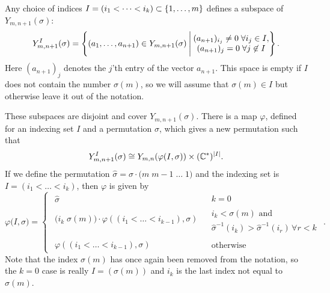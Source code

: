 \begin{lemma}
  \label{lem:permutation}
  Any choice of indices $I= (i_1<\dots<i_k) \subset \left\{ 1,\dots,m \right\}$
  defines a subspace of $Y_{m,n+1}(\sigma)$:
  \[ Y_{m,n+1}^I(\sigma) = \left\{ (a_1,\dots,a_{n+1}) \in
    Y_{m,n+1}(\sigma) \:\Bigg\vert\: 
    \begin{matrix} 
      (a_{n+1})_{i_j} \neq 0\; \forall i_j \in I, \\
      (a_{n+1})_j = 0 \;\forall j \not\in I
    \end{matrix}  \right\}. \]
  Here $(a_{n+1})_j$ denotes the $j$'th entry of the vector $a_{n+1}$.
  This space is empty if $I$ does not contain the number $\sigma(m)$,
  so we will assume that $\sigma(m) \in I$ but otherwise leave it out
  of the notation.
  
  These subspaces are disjoint and cover $Y_{m,n+1}(\sigma)$. There is
  a map $\varphi$,
  defined for an indexing set $I$ and a permutation $\sigma$, which
  gives a new permutation such that
  \[ Y_{m,n+1}^I(\sigma) \cong Y_{m,n}(\varphi(I,\sigma)) \times
  (\mathbb{C}^*)^{\left| I \right|}. \]
  If we define the permutation $\widehat \sigma = \sigma \cdot
  \big(m\; m-1\; \dots \; 1\big)$ and the indexing set is ${I = (i_1 <
    \dots < i_k)}$, then $\varphi$ is given by
  \[ \varphi\big(I,\sigma\big) = 
  \begin{cases}
    \begin{matrix} \widehat\sigma \end{matrix} & 
    \begin{array}{l} k = 0 \end{array} \\
    \begin{matrix}
      \big( i_k\; \sigma(m) \big) \cdot \varphi\left( (i_1 < \dots <
        i_{k-1}),\sigma\right) \\
    \end{matrix} &
    \begin{array}{l} i_k < \sigma(m) \text{ and } \\
      \widehat\sigma^{-1}(i_k) > \widehat\sigma^{-1}(i_r) \,
      \forall r < k\end{array}\\
    \begin{matrix}
      \varphi\left( (i_1 < \dots < i_{k-1}),\sigma\right)
    \end{matrix} &
    \begin{array}{l} \text{otherwise} \end{array}
  \end{cases}. \]
  Note that the index $\sigma(m)$ has once again been removed from the
  notation, 
  so the $k = 0$ case is really $I = (\sigma(m))$ and $i_k$
  is the last index not equal to $\sigma(m)$.
\end{lemma} 
